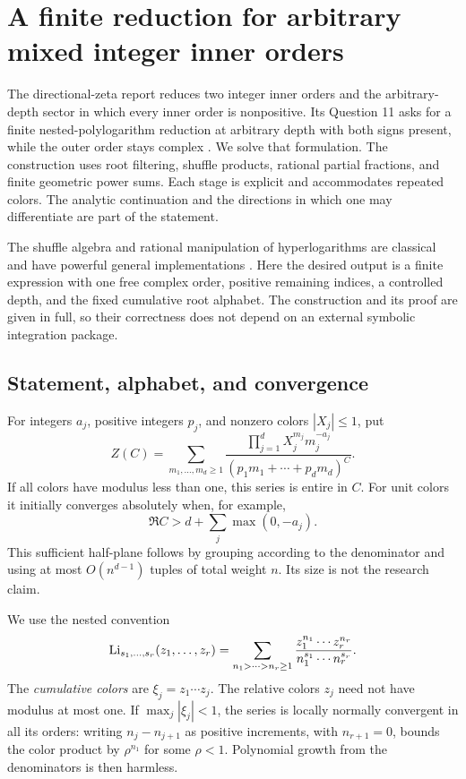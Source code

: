 \section{A finite reduction for arbitrary mixed integer inner orders}
\label{mixed:section}

The directional-zeta report reduces two integer inner orders and the
arbitrary-depth sector in which every inner order is nonpositive. Its
Question 11 asks for a finite nested-polylogarithm reduction at arbitrary
depth with both signs present, while the outer order stays complex
\cite{RepoDirectional}. We solve that formulation. The construction uses
root filtering, shuffle products, rational partial fractions, and finite
geometric power sums. Each stage is explicit and accommodates repeated
colors. The analytic continuation and the directions in which one may
differentiate are part of the statement.

The shuffle algebra and rational manipulation of hyperlogarithms are
classical and have powerful general implementations \cite{Panzer}.
Here the desired output is a finite expression with one free complex
order, positive remaining indices, a controlled depth, and the fixed
cumulative root alphabet. The construction and its proof are given in
full, so their correctness does not depend on an external symbolic
integration package.

\subsection{Statement, alphabet, and convergence}

For integers $a_j$, positive integers $p_j$, and nonzero colors
$|X_j|\le1$, put
\begin{equation}\label{mixed:Z}
 Z(C)=\sum_{m_1,\ldots,m_d\ge1}
       \frac{\prod_{j=1}^d X_j^{m_j}m_j^{-a_j}}
            {(p_1m_1+\cdots+p_dm_d)^C}.
\end{equation}
If all colors have modulus less than one, this series is entire in
$C$. For unit colors it initially converges absolutely when, for example,
\[
              \Re C>d+\sum_j\max(0,-a_j).
\]
This sufficient half-plane follows by grouping according to the
denominator and using at most $O(n^{d-1})$ tuples of total weight $n$.
Its size is not the research claim.

We use the nested convention
\begin{equation}\label{mixed:Li}
 \operatorname{Li}_{s_1,\ldots,s_r}(z_1,\ldots,z_r)
  =\sum_{n_1>\cdots>n_r\ge1}
            \frac{z_1^{n_1}\cdots z_r^{n_r}}
                 {n_1^{s_1}\cdots n_r^{s_r}}.
\end{equation}
The \emph{cumulative colors} are $\xi_j=z_1\cdots z_j$.
The relative colors $z_j$ need not have modulus at most one.
If $\max_j|\xi_j|<1$, the series is locally normally convergent in
all its orders: writing $n_j-n_{j+1}$ as positive increments, with
$n_{r+1}=0$, bounds the color product by $\rho^{n_1}$ for some
$\rho<1$. Polynomial growth from the denominators is then harmless.


